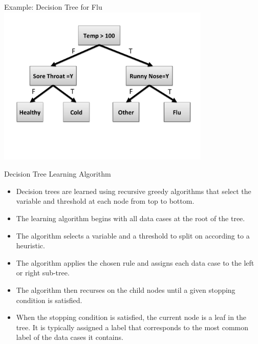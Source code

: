 \documentclass[serif,xcolor=pdftex,dvipsnames,table,hyperref={bookmarks=false}]{beamer}
\begin{document}
\begin{frame}[t]{Example: Decision Tree for Flu}
 \centering
 \includegraphics[width=4in]{../Figures/decision-tree.pdf}
\end{frame}

\begin{frame}[t]{Decision Tree Learning Algorithm}

\begin{itemize}
\item Decision trees are learned using recursive greedy algorithms that 
select the variable and threshold at each node from top to bottom.

\pause\item The learning algorithm begins with all data cases at the root of the tree.

\pause\item The algorithm selects a variable and a threshold to split on according to a heuristic.

\pause\item The algorithm applies the chosen rule and assigns each data case to
the left or right sub-tree.

\pause\item The algorithm then recurses on the child nodes until a given stopping condition is satisfied.

\pause\item When the stopping condition is satisfied, the current node is a leaf
in the tree. It is typically assigned a label that corresponds to the most common label of the
data cases it contains.

\end{itemize}

\end{frame}
\end{document}
